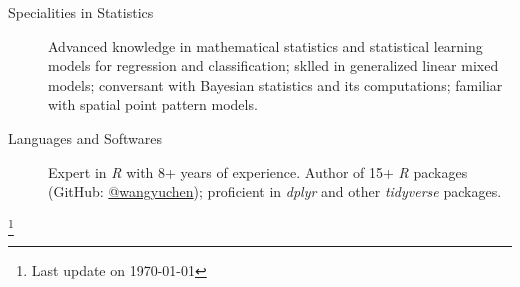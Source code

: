 \documentclass[11pt]{article}
\newcommand{\CPP}
{C\nolinebreak[4]\hspace{0em}\raisebox{.12ex}{\footnotesize\bf ++}}
\begin{document}
	\begin{description}
		\item[Specialities in Statistics] Advanced knowledge in mathematical statistics and statistical learning models for regression and classification; sklled in generalized linear mixed models; conversant with Bayesian statistics and its computations; familiar with spatial point pattern models.
		\item[Languages and Softwares] Expert in \emph{R} with 8+ years of experience. Author of 15+ \emph{R} packages (GitHub: \href{https://www.github.com/wangyuchen}{@wangyuchen}); proficient in \emph{dplyr} and other \emph{tidyverse} packages.
	\end{description}

\let\thefootnote\relax\footnote{Last update on \today}
\end{document}
